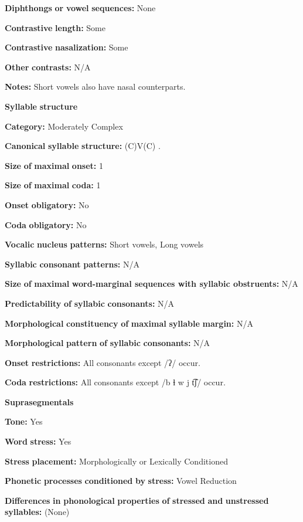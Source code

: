 \textbf{Diphthongs} \textbf{or} \textbf{vowel} \textbf{sequences:} None

\textbf{Contrastive} \textbf{length:} Some

\textbf{Contrastive} \textbf{nasalization:} Some

\textbf{Other} \textbf{contrasts:} N/A

\textbf{Notes:} Short vowels also have nasal counterparts.

\textbf{Syllable} \textbf{structure}

\textbf{Category:} Moderately Complex

\textbf{Canonical} \textbf{syllable} \textbf{structure:} (C)V(C) \citep[18-21]{Broadwell2006}.

\textbf{Size} \textbf{of} \textbf{maximal} \textbf{onset:} 1

\textbf{Size} \textbf{of} \textbf{maximal} \textbf{coda:} 1

\textbf{Onset} \textbf{obligatory:} No

\textbf{Coda} \textbf{obligatory:} No

\textbf{Vocalic} \textbf{nucleus} \textbf{patterns:} Short vowels, Long vowels

\textbf{Syllabic} \textbf{consonant} \textbf{patterns:} N/A

\textbf{Size} \textbf{of} \textbf{maximal} \textbf{word{}-marginal sequences with syllabic obstruents:} N/A

\textbf{Predictability} \textbf{of} \textbf{syllabic} \textbf{consonants:} N/A

\textbf{Morphological} \textbf{constituency} \textbf{of} \textbf{maximal} \textbf{syllable} \textbf{margin:} N/A

\textbf{Morphological} \textbf{pattern} \textbf{of} \textbf{syllabic} \textbf{consonants:} N/A

\textbf{Onset} \textbf{restrictions:} All consonants except /ʔ/ occur.

\textbf{Coda} \textbf{restrictions:} All consonants except /b ɬ w j t͡ʃ/ occur.

\textbf{Suprasegmentals}

\textbf{Tone:} Yes

\textbf{Word} \textbf{stress:} Yes

\textbf{Stress} \textbf{placement:} Morphologically or Lexically Conditioned

\textbf{Phonetic} \textbf{processes} \textbf{conditioned} \textbf{by} \textbf{stress:} Vowel Reduction

\textbf{Differences} \textbf{in} \textbf{phonological} \textbf{properties} \textbf{of} \textbf{stressed} \textbf{and} \textbf{unstressed} \textbf{syllables:} (None)

